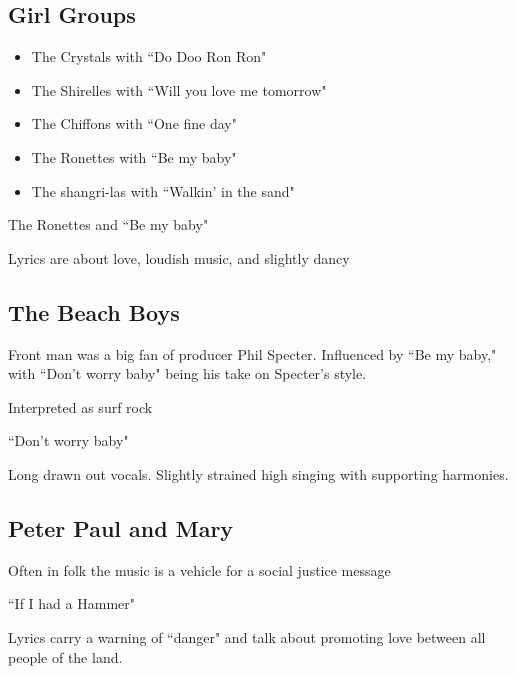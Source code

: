 \documentclass[12pt, a4paper, twoside, openright, titlepage]{book}
\begin{document}
\subsection{Girl Groups}

\begin{itemize}
    \item The Crystals with ``Do Doo Ron Ron"
    \item The Shirelles with ``Will you love me tomorrow"
    \item The Chiffons with ``One fine day"
    \item The Ronettes with ``Be my baby"
    \item The shangri-las with ``Walkin' in the sand"
\end{itemize}

\begin{eg}{}{}
    The Ronettes and ``Be my baby"

    Lyrics are about love, loudish music, and slightly dancy
\end{eg}

\subsection{The Beach Boys}

Front man  was a big fan of producer Phil Specter. Influenced by ``Be my baby," with ``Don't worry baby" being his take on Specter's style.

Interpreted as surf rock
\begin{eg}{}{}
    ``Don't worry baby"

    Long drawn out vocals. Slightly strained high singing with supporting harmonies.
\end{eg}


\subsection{Peter Paul and Mary}

\begin{rmk}{}{}
    Often in folk the music is a vehicle for a social justice message
\end{rmk}

\begin{eg}{}{}
    ``If I had a Hammer"

    Lyrics carry a warning of ``danger" and talk about promoting love between all people of the land.
\end{eg}
\end{document}

